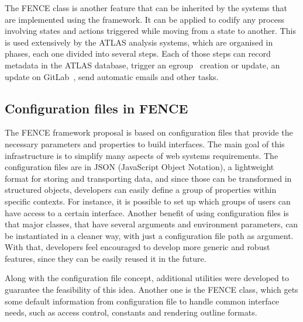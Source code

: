 The FENCE  class is another feature that can be inherited by the systems that are implemented using the framework.
It can be applied to codify any process involving states and actions triggered while moving from a state to another.
This is used extensively by the ATLAS analysis systems, which are organised in phases, each one divided into several steps.
Each of those steps can record metadata in the ATLAS database, trigger an egroup~\cite{egroups} creation or update, an update on GitLab~\cite{gitlab}, send automatic emails and other tasks.


\subsection{Configuration files in FENCE}%
\label{sec:Configuration_files_in_FENCE}

The FENCE framework proposal is based on configuration files that provide the necessary parameters and properties to build interfaces.
The main goal of this infrastructure is to simplify many aspects of web systems requirements. The configuration files are in JSON (JavaScript Object Notation), a lightweight format for storing and transporting data, and since those can be transformed in structured objects, developers can easily define a group of properties within specific contexts.
For instance, it is possible to set up which groups of users can have access to a certain interface.
Another benefit of using configuration files is that major classes, that have several arguments and environment parameters, can be instantiated in a cleaner way, with just a configuration file path as argument.
With that, developers feel encouraged to develop more generic and robust features, since they can be easily reused it in the future.

Along with the configuration file concept, additional utilities were developed to guarantee the feasibility of this idea.
Another one is the FENCE  class, which gets some default information from configuration file to handle common interface needs, such as access control, constants and rendering outline formats. 

